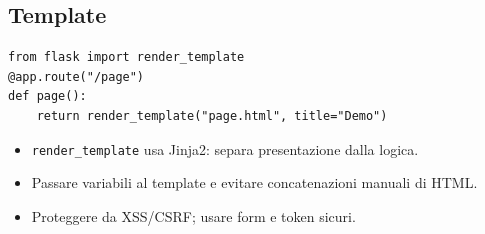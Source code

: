 \subsection{Template}
\begin{lstlisting}
from flask import render_template
@app.route("/page")
def page():
    return render_template("page.html", title="Demo")
\end{lstlisting}

\begin{tcolorbox}[title=Spiegazione]
\begin{itemize}
  \item \texttt{render\_template} usa Jinja2: separa presentazione dalla logica.
  \item Passare variabili al template e evitare concatenazioni manuali di HTML.
  \item Proteggere da XSS/CSRF; usare form e token sicuri.
\end{itemize}
\end{tcolorbox}

